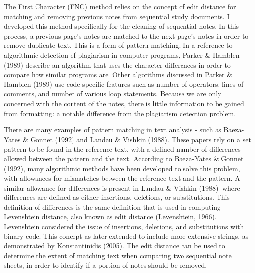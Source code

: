 \documentclass[print]{nuthesis}
\begin{document}
The First  Character (FNC) method relies on the concept of edit distance for matching and removing previous notes from sequential study documents.
I developed this method specifically for the cleaning of sequential notes.
In this process, a previous page's notes are matched to the next page's notes in order to remove duplicate text.
This is a form of pattern matching.
In a reference to algorithmic detection of plagiarism in computer programs, Parker \& Hamblen (1989) describe an algorithm that uses the character differences in order to compare how similar programs are.
Other algorithms discussed in Parker \& Hamblen (1989) use code-specific features such as number of operators, lines of comments, and number of various loop statements.
Because we are only concerned with the content of the notes, there is little information to be gained from formatting: a notable difference from the plagiarism detection problem.

There are many examples of pattern matching in text analysis - such as Baeza-Yates \& Gonnet (1992) and Landau \& Vishkin (1988).
These papers rely on a set pattern to be found in the reference text, with a defined number of differences allowed between the pattern and the text.
According to Baeza-Yates \& Gonnet (1992), many algorithmic methods have been developed to solve this problem, with allowances for mismatches between the reference text and the pattern.
A similar allowance for differences is present in Landau \& Vishkin (1988), where differences are defined as either insertions, deletions, or substitutions.
This definition of differences is the same definition that is used in computing Levenshtein distance, also known as edit distance (Levenshtein, 1966).
Levenshtein considered the issue of insertions, deletions, and substitutions with binary code.
This concept as later extended to include more extensive strings, as demonstrated by Konstantinidis (2005).
The edit distance can be used to determine the extent of matching text when comparing two sequential note sheets, in order to identify if a portion of notes should be removed.
\end{document}
